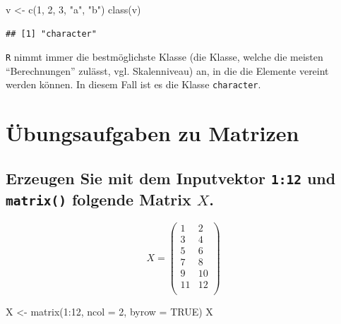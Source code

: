 \documentclass[12pt,a4paper]{article}
\newenvironment{Shaded}{\begin{snugshade}}{\end{snugshade}}
\newcommand{\AttributeTok}[1]{\textcolor[rgb]{0.77,0.63,0.00}{#1}}
\newcommand{\ConstantTok}[1]{\textcolor[rgb]{0.00,0.00,0.00}{#1}}
\newcommand{\DecValTok}[1]{\textcolor[rgb]{0.00,0.00,0.81}{#1}}
\newcommand{\FunctionTok}[1]{\textcolor[rgb]{0.00,0.00,0.00}{#1}}
\newcommand{\NormalTok}[1]{#1}
\newcommand{\OtherTok}[1]{\textcolor[rgb]{0.56,0.35,0.01}{#1}}
\newcommand{\SpecialCharTok}[1]{\textcolor[rgb]{0.00,0.00,0.00}{#1}}
\newcommand{\StringTok}[1]{\textcolor[rgb]{0.31,0.60,0.02}{#1}}
\begin{document}
\begin{Shaded}
\begin{Highlighting}[]
\NormalTok{    v }\OtherTok{\textless{}{-}} \FunctionTok{c}\NormalTok{(}\DecValTok{1}\NormalTok{, }\DecValTok{2}\NormalTok{, }\DecValTok{3}\NormalTok{, }\StringTok{"a"}\NormalTok{, }\StringTok{"b"}\NormalTok{)}
    \FunctionTok{class}\NormalTok{(v)}
\end{Highlighting}
\end{Shaded}

\begin{verbatim}
## [1] "character"
\end{verbatim}

\texttt{R} nimmt immer die bestmöglichste Klasse (die Klasse, welche die
meisten ``Berechnungen'' zulässt, vgl. Skalenniveau) an, in die die
Elemente vereint werden können. In diesem Fall ist es die Klasse
\texttt{character}.

\vspace{0.5cm}

\hypertarget{uxfcbungsaufgaben-zu-matrizen}{%
\section{Übungsaufgaben zu
Matrizen}\label{uxfcbungsaufgaben-zu-matrizen}}

\hypertarget{erzeugen-sie-mit-dem-inputvektor-112-und-folgende-matrix-x.}{%
\subsection{\texorpdfstring{Erzeugen Sie mit dem Inputvektor
\texttt{1:12} und \texttt{matrix()} folgende Matrix
\(X\).}{Erzeugen Sie mit dem Inputvektor 1:12 und  folgende Matrix X.}}\label{erzeugen-sie-mit-dem-inputvektor-112-und-folgende-matrix-x.}}

\[ X = \begin{pmatrix} 1 & 2 \\ 3 & 4\\ 5 & 6 \\ 7 & 8 \\
9 & 10 \\ 11 & 12 \\\end{pmatrix}\]

\begin{Shaded}
\begin{Highlighting}[]
\NormalTok{    X }\OtherTok{\textless{}{-}} \FunctionTok{matrix}\NormalTok{(}\DecValTok{1}\SpecialCharTok{:}\DecValTok{12}\NormalTok{, }\AttributeTok{ncol =} \DecValTok{2}\NormalTok{, }\AttributeTok{byrow =} \ConstantTok{TRUE}\NormalTok{)}
\NormalTok{    X}
\end{Highlighting}
\end{Shaded}
\end{document}
